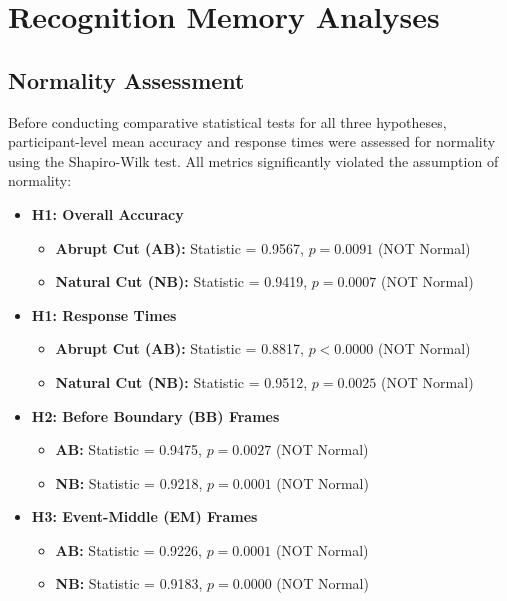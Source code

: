 \section{Recognition Memory Analyses}

\subsection{Normality Assessment}
Before conducting comparative statistical tests for all three hypotheses, participant-level mean accuracy and response times were assessed for normality using the Shapiro-Wilk test. All metrics significantly violated the assumption of normality:

\begin{itemize}
    \item \textbf{H1: Overall Accuracy}
        \begin{itemize}
            \item \textbf{Abrupt Cut (AB):} Statistic = 0.9567, $p = 0.0091$ (NOT Normal)
            \item \textbf{Natural Cut (NB):} Statistic = 0.9419, $p = 0.0007$ (NOT Normal)
        \end{itemize}
    \item \textbf{H1: Response Times}
        \begin{itemize}
            \item \textbf{Abrupt Cut (AB):} Statistic = 0.8817, $p < 0.0000$ (NOT Normal)
            \item \textbf{Natural Cut (NB):} Statistic = 0.9512, $p = 0.0025$ (NOT Normal)
        \end{itemize}
    \item \textbf{H2: Before Boundary (BB) Frames}
        \begin{itemize}
            \item \textbf{AB:} Statistic = 0.9475, $p = 0.0027$ (NOT Normal)
            \item \textbf{NB:} Statistic = 0.9218, $p = 0.0001$ (NOT Normal)
        \end{itemize}
    \item \textbf{H3: Event-Middle (EM) Frames}
        \begin{itemize}
            \item \textbf{AB:} Statistic = 0.9226, $p = 0.0001$ (NOT Normal)
            \item \textbf{NB:} Statistic = 0.9183, $p = 0.0000$ (NOT Normal)
        \end{itemize}
\end{itemize}

